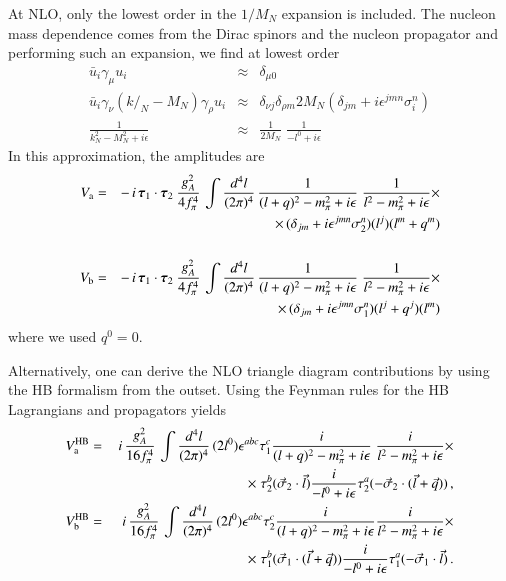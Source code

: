 \documentclass[sort&compress,preprint,3p]{elsarticle}
\newcommand{\bbox}[1]{\mbox{\boldmath $#1$}}
\begin{document}
%
At NLO, only the lowest order in the $1/M_N$ expansion
is included. The nucleon mass dependence comes from the Dirac spinors
and the nucleon propagator and performing such an expansion, 
we find at lowest order
\begin{eqnarray}
\bar{u}_i \gamma_\mu u_i & \approx &  \delta_{\mu 0}
\\
\bar{u}_i \gamma_\nu 
(k  \!\!\!\slash_{N} - M_N)
\gamma_\rho  u_i 
& \approx &
\delta_{\nu j} \delta_{\rho m} 2 M_N (\delta_{jm} 
+ i \epsilon^{jmn} \sigma_i^n)
\\
\frac{1}{k_{N}^2 - M_N^2 + i\epsilon} 
& \approx & 
\frac{1}{2M_N} \; \frac{1}{-l^0 + i\epsilon}
\end{eqnarray}
%
In this approximation, the amplitudes are
\begin{eqnarray}
V_{\rm a} &=& 
 -\, i\, \bbox{\tau}_1 \cdot \bbox{\tau}_2 \:
\frac{g_A^2}{4 f_\pi^4} \,
\int \frac{d^4 l}{(2\pi)^4} \,
\frac{1}{(l+q)^2-m_\pi^2+i\epsilon} \;
\frac{1}{l^2-m_\pi^2+i\epsilon} 
\times \nonumber \\ && \times \,
(\delta_{jm} + i \epsilon^{jmn} \sigma_2^n)
(l^j) (l^m+q^m) 
\label{eq_Va}
\\ 
\nonumber \\
V_{\rm b} &=& 
 -\, i\, \bbox{\tau}_1 \cdot \bbox{\tau}_2 \:
\frac{g_A^2}{4 f_\pi^4} \,
\int \frac{d^4 l}{(2\pi)^4} \,
\frac{1}{(l+q)^2-m_\pi^2+i\epsilon} \;
\frac{1}{l^2-m_\pi^2+i\epsilon} 
\times \nonumber \\ && \times \,
(\delta_{jm} + i \epsilon^{jmn} \sigma_1^n)
(l^j+q^j) (l^m) 
\label{eq_Vb}
\end{eqnarray}
%
where we used $q^0=0$. 

Alternatively, one can derive the NLO triangle diagram contributions 
by using the HB formalism from the outset.
Using the Feynman rules for the HB Lagrangians and propagators yields
\begin{eqnarray}
V_{\rm a}^{\rm HB} &=& \, i\, \frac{g_A^2}{16 f_\pi^4} \,
\int \frac{d^4 l}{(2\pi)^4} \,
(2 l^0) \epsilon^{abc} \tau^c_1 
\frac{i}{(l+q)^2-m_\pi^2+i\epsilon} \;
\frac{i}{l^2-m_\pi^2+i\epsilon} 
\times \nonumber \\ && \times \;
\tau^b_2 (\vec \sigma_2 \cdot \vec l)
\frac{i}{-l^0 + i\epsilon}
\tau^a_2 (-\vec \sigma_2 \cdot (\vec l + \vec q))
   \,,    \\
V_{\rm b}^{\rm HB} &=& \, i\, \frac{g_A^2}{16 f_\pi^4} \,
\int \frac{d^4 l}{(2\pi)^4} \,
(2 l^0) \epsilon^{abc} \tau^c_2 
\frac{i}{(l+q)^2-m_\pi^2+i\epsilon}
\frac{i}{l^2-m_\pi^2+i\epsilon} 
\times \nonumber \\ && \times \;
\tau^b_1 (\vec \sigma_1 \cdot (\vec l + \vec q))
\frac{i}{-l^0 + i\epsilon}
\tau^a_1 (-\vec \sigma_1 \cdot \vec l)
\,.
\end{eqnarray}
\end{document}

